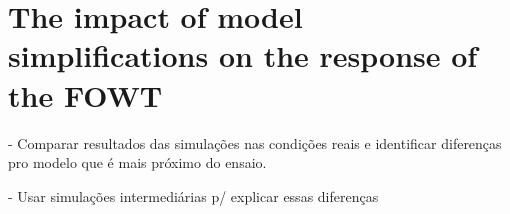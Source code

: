 \section{The impact of model simplifications on the response of the FOWT} \label{sec:impact_simplifications}
- Comparar resultados das simulações nas condições reais e identificar diferenças pro modelo que é mais próximo do ensaio.

- Usar simulações intermediárias p/ explicar essas diferenças

%
